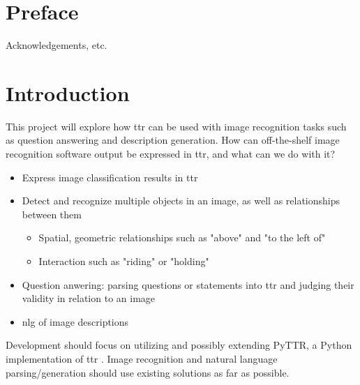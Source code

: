 \documentclass[11pt, a4paper]{article}
\begin{document}
\section*{Preface}

Acknowledgements, etc.

\thispagestyle{empty}

\newpage

\begin{spacing}{0.0}
\tableofcontents
\end{spacing}

\thispagestyle{empty}

\newpage
\setcounter{page}{1}

\section{Introduction}
\label{sec:intro}

This project will explore how \gls{ttr} can be used with image recognition tasks such as question answering and description generation.
How can off-the-shelf image recognition software output be expressed in \gls{ttr}, and what can we do with it?

\begin{itemize}
\item Express image classification results in \gls{ttr}
\item Detect and recognize multiple objects in an image, as well as relationships between them
\begin{itemize}
\item Spatial, geometric relationships such as "above" and "to the left of"
\item Interaction such as "riding" or "holding"
\end{itemize}
\item Question anwering: parsing questions or statements into \gls{ttr} and judging their validity in relation to an image
\item \gls{nlg} of image descriptions
\end{itemize}

\noindent
Development should focus on utilizing and possibly extending PyTTR, a Python implementation of \gls{ttr} \citep{pyttr}. Image recognition and natural language parsing/generation should use existing solutions as far as possible.
\end{document}
